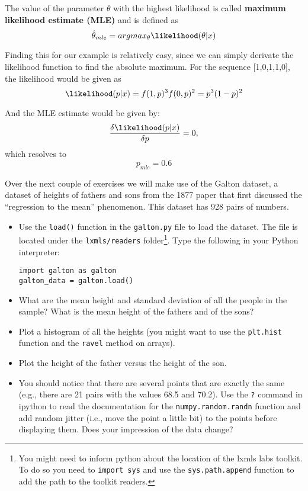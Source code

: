 The value of the parameter $\theta$ with the highest likelihood is called {\bf maximum likelihood estimate (MLE)} and is defined as
\begin{equation*}
\hat{\theta}_{mle}=argmax_{\theta}\likelihood(\theta|x)
\end{equation*}

Finding this for our example is relatively easy, since we can simply derivate the likelihood function to find the absolute maximum. For the sequence [1,0,1,1,0], the likelihood would be given as
\begin{equation*}
\likelihood(p|x) = f(1,p)^3f(0,p)^2 = p^3(1-p)^2
\end{equation*}

And the MLE estimate would be given by:
\begin{equation*}
\frac{\delta \likelihood(p|x)}{\delta p}=0,
\end{equation*}
%
which resolves to
\begin{equation*}
p_{mle}=0.6
\end{equation*}

\begin{exercise}
Over the next couple of exercises we will make use of the Galton dataset, a dataset of heights of fathers and sons from the 1877 paper that first discussed the ``regression to the mean'' phenomenon. This dataset has 928 pairs of numbers.
\begin{itemize}
\item Use the \texttt{load()} function in the \texttt{galton.py} file to load the dataset. 
The file is located under the \texttt{lxmls/readers} folder\footnote{
You might need to inform python about the location of the lxmls labs toolkit.
To do so you need to \texttt{import sys} and use the \texttt{sys.path.append} function to add the path to the toolkit readers.}. 
Type the following in your Python interpreter:
\begin{verbatim}
import galton as galton
galton_data = galton.load()
\end{verbatim}
\item What are the mean height and standard deviation of all the people in the sample? What is the mean height of the fathers and of the sons?
\item Plot a histogram of all the heights (you might want to use the \texttt{plt.hist} function and the \texttt{ravel} method on arrays).
\item Plot the height of the father versus the height of the son.
\item You should notice that there are several points that are exactly the same (e.g., there are 21 pairs with the values 68.5 and 70.2). Use the \texttt{?} command in ipython to read the documentation for the \texttt{numpy.random.randn} function and add random jitter (i.e., move the point a little bit) to the points before displaying them. Does your impression of the data change?
\end{itemize}
\end{exercise}

